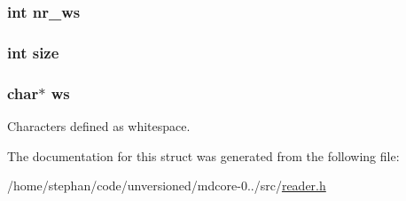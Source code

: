 \hypertarget{structreader_a9cc374c220e8585d7e5470f1b48279a6}{
\subsubsection[{nr\-\_\-ws}]{\setlength{\rightskip}{0pt plus 5cm}int nr\-\_\-ws}}\label{structreader_a9cc374c220e8585d7e5470f1b48279a6}
\hypertarget{structreader_a439227feff9d7f55384e8780cfc2eb82}{
\subsubsection[{size}]{\setlength{\rightskip}{0pt plus 5cm}int size}}\label{structreader_a439227feff9d7f55384e8780cfc2eb82}
\hypertarget{structreader_a13ac982f10e04f30e71bee5775f0daf4}{
\subsubsection[{ws}]{\setlength{\rightskip}{0pt plus 5cm}char$\ast$ ws}}\label{structreader_a13ac982f10e04f30e71bee5775f0daf4}
Characters defined as whitespace. 

The documentation for this struct was generated from the following file\-:\begin{DoxyCompactItemize}
\item 
/home/stephan/code/unversioned/mdcore-\/0../src/\hyperlink{reader_8h}{reader.\-h}\end{DoxyCompactItemize}
